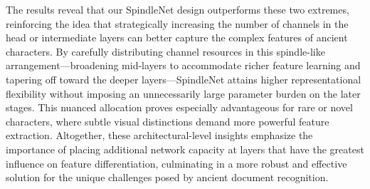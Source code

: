 The results reveal that our SpindleNet design outperforms these two extremes, reinforcing the idea that strategically increasing the number of channels in the head or intermediate layers can better capture the complex features of ancient characters. By carefully distributing channel resources in this spindle-like arrangement—broadening mid-layers to accommodate richer feature learning and tapering off toward the deeper layers—SpindleNet attains higher representational flexibility without imposing an unnecessarily large parameter burden on the later stages. This nuanced allocation proves especially advantageous for rare or novel characters, where subtle visual distinctions demand more powerful feature extraction. Altogether, these architectural-level insights emphasize the importance of placing additional network capacity at layers that have the greatest influence on feature differentiation, culminating in a more robust and effective solution for the unique challenges posed by ancient document recognition.


















